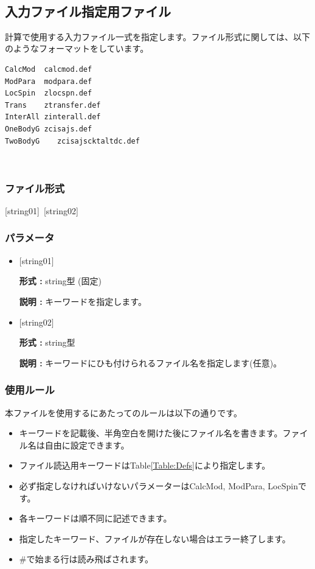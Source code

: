 \newpage
~\subsection{入力ファイル指定用ファイル}
\label{Subsec:InputFileList}
計算で使用する入力ファイル一式を指定します。ファイル形式に関しては、以下のようなフォーマットをしています。\\
\begin{minipage}{10cm}
\begin{screen}
\begin{verbatim}
CalcMod  calcmod.def
ModPara  modpara.def
LocSpin  zlocspn.def
Trans    ztransfer.def
InterAll zinterall.def
OneBodyG zcisajs.def
TwoBodyG	zcisajscktaltdc.def
\end{verbatim}
\end{screen}
\end{minipage}
\\
\subsubsection{ファイル形式}
[string01]~[string02]
\subsubsection{パラメータ}
 \begin{itemize}
   \item  $[$string01$]$
   
   {\bf 形式 :} string型 (固定)
   
   {\bf 説明 :} キーワードを指定します。
   
   \item  $[$string02$]$
   
    {\bf 形式 :} string型 

   {\bf 説明 :} キーワードにひも付けられるファイル名を指定します(任意)。
 \end{itemize}
\subsubsection{使用ルール}
本ファイルを使用するにあたってのルールは以下の通りです。
\begin{itemize}
\item キーワードを記載後、半角空白を開けた後にファイル名を書きます。ファイル名は自由に設定できます。
\item ファイル読込用キーワードはTable\ref{Table:Defs}により指定します。
\item 必ず指定しなければいけないパラメーターはCalcMod, ModPara, LocSpinです。
\item 各キーワードは順不同に記述できます。
\item 指定したキーワード、ファイルが存在しない場合はエラー終了します。
\item $\#$で始まる行は読み飛ばされます。
\end{itemize}

